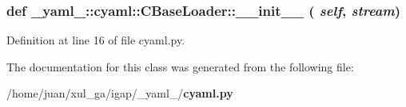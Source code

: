 \subsubsection{\setlength{\rightskip}{0pt plus 5cm}def \_\-yaml\_\-::cyaml::CBaseLoader::\_\-\_\-init\_\-\_\- ( {\em self},  {\em stream})}\label{class__yaml___1_1cyaml_1_1CBaseLoader_b0ce970447e188087143e54f8f264098}




Definition at line 16 of file cyaml.py.

The documentation for this class was generated from the following file:\begin{CompactItemize}
\item 
/home/juan/xul\_\-ga/igap/\_\-yaml\_\-/{\bf cyaml.py}\end{CompactItemize}
